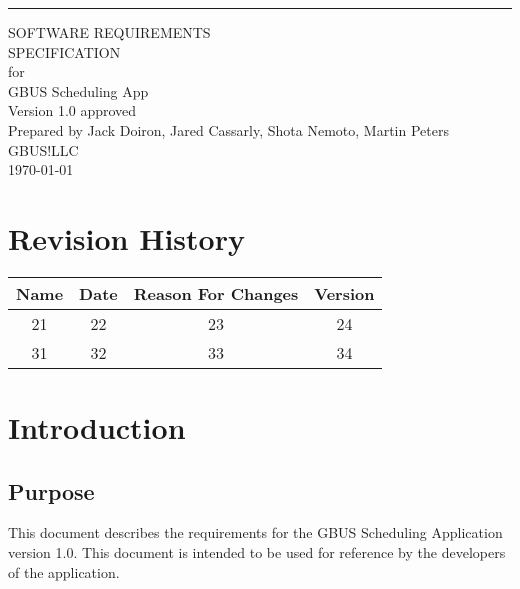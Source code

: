\documentclass{scrreprt}
\date{}
\def\myversion{1.0 }
\begin{document}
\begin{flushright}
    \rule{16cm}{5pt}\vskip1cm
    \begin{bfseries}
        \Huge{SOFTWARE REQUIREMENTS\\ SPECIFICATION}\\
        \vspace{1.9cm}
        for\\
        \vspace{1.9cm}
        GBUS Scheduling App\\
        \vspace{1.9cm}
        \LARGE{Version \myversion approved}\\
        \vspace{1.9cm}
        Prepared by Jack Doiron, Jared Cassarly, Shota Nemoto, Martin Peters\\
        \vspace{1.5cm}
        GBUS!LLC\\
        \vspace{1.5cm}
        \today\\
    \end{bfseries}
\end{flushright}

\tableofcontents


\chapter*{Revision History}

\begin{center}
    \begin{tabular}{|c|c|c|c|}
        \hline
	    Name & Date & Reason For Changes & Version\\
        \hline
	    21 & 22 & 23 & 24\\
        \hline
	    31 & 32 & 33 & 34\\
        \hline
    \end{tabular}
\end{center}

\chapter{Introduction}

\section{Purpose}
This document describes the requirements for the GBUS Scheduling Application version 1.0.  This document is intended to be used for reference by the developers of the application.
\end{document}
